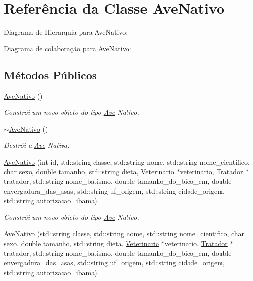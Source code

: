 \hypertarget{classAveNativo}{}\section{Referência da Classe Ave\+Nativo}
\label{classAveNativo}


Diagrama de Hierarquia para Ave\+Nativo\+:


Diagrama de colaboração para Ave\+Nativo\+:
\subsection*{Métodos Públicos}
\begin{DoxyCompactItemize}
\item 
\mbox{\label{classAveNativo_a3f84390deb367b29198c6fe20c020873}} 
\hyperlink{classAveNativo_a3f84390deb367b29198c6fe20c020873}{Ave\+Nativo} ()
\begin{DoxyCompactList}\small\item\em Constrói um novo objeto do tipo \hyperlink{classAve}{Ave} Nativo. \end{DoxyCompactList}\item 
\mbox{\label{classAveNativo_a3a1ebe2fd7ce2d879953868bc50f89a5}} 
\hyperlink{classAveNativo_a3a1ebe2fd7ce2d879953868bc50f89a5}{$\sim$\+Ave\+Nativo} ()
\begin{DoxyCompactList}\small\item\em Destrói a \hyperlink{classAve}{Ave} Nativa. \end{DoxyCompactList}\item 
\hyperlink{classAveNativo_a5a51d97043dbf61f0c6ed91076242a42}{Ave\+Nativo} (int id, std\+::string classe, std\+::string nome, std\+::string nome\+\_\+cientifico, char sexo, double tamanho, std\+::string dieta, \hyperlink{classVeterinario}{Veterinario} $\ast$veterinario, \hyperlink{classTratador}{Tratador} $\ast$tratador, std\+::string nome\+\_\+batismo, double tamanho\+\_\+do\+\_\+bico\+\_\+cm, double envergadura\+\_\+das\+\_\+asas, std\+::string uf\+\_\+origem, std\+::string cidade\+\_\+origem, std\+::string autorizacao\+\_\+ibama)
\begin{DoxyCompactList}\small\item\em Constrói um novo objeto do tipo \hyperlink{classAve}{Ave} Nativo. \end{DoxyCompactList}\item 
\hyperlink{classAveNativo_aebc9f0533ed3b97268334e3a0217673c}{Ave\+Nativo} (std\+::string classe, std\+::string nome, std\+::string nome\+\_\+cientifico, char sexo, double tamanho, std\+::string dieta, \hyperlink{classVeterinario}{Veterinario} $\ast$veterinario, \hyperlink{classTratador}{Tratador} $\ast$tratador, std\+::string nome\+\_\+batismo, double tamanho\+\_\+do\+\_\+bico\+\_\+cm, double envergadura\+\_\+das\+\_\+asas, std\+::string uf\+\_\+origem, std\+::string cidade\+\_\+origem, std\+::string autorizacao\+\_\+ibama)

\end{DoxyCompactItemize}
